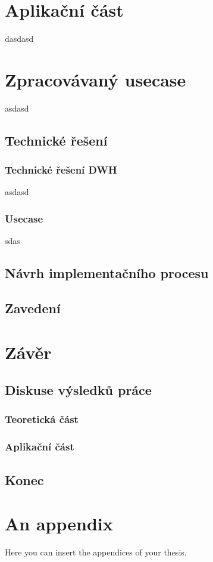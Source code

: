 \documentclass[
  digital,     %
  twoside,     %
  lof,         %
  lot,         %
]{fithesis4}
\begin{document}
\chapter{Aplikační část}
dasdasd

\chapter{Zpracovávaný usecase}
asdasd

\section{Technické řešení}
\subsection{Technické řešení DWH}
asdasd
\subsection{Usecase}
sdas

\section{Návrh implementačního procesu}
\section{Zavedení}

\chapter{Závěr}
\section{Diskuse výsledků práce}
\subsection{Teoretická část}
\subsection{Aplikační část}
\section{Konec}

\printbibliography[heading=bibintoc] %

  \makeatletter\thesis@blocks@clear\makeatother
  \printindex

\appendix %
\chapter{An appendix}
Here you can insert the appendices of your thesis.
\end{document}
